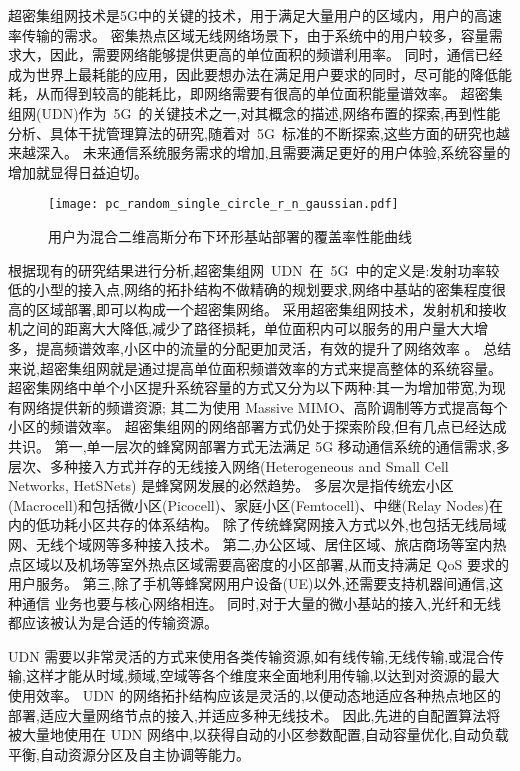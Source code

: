 超密集组网技术是5G中的关键的技术，用于满足大量用户的区域内，用户的高速率传输的需求。
密集热点区域无线网络场景下，由于系统中的用户较多，容量需求大，因此，需要网络能够提供更高的单位面积的频谱利用率。
同时，通信已经成为世界上最耗能的应用，因此要想办法在满足用户要求的同时，尽可能的降低能耗，从而得到较高的能耗比，即网络需要有很高的单位面积能量谱效率。
超密集组网(UDN)作为~5G~的关键技术之一,对其概念的描述,网络布置的探索,再到性能分析、具体干扰管理算法的研究,随着对~5G~标准的不断探索,这些方面的研究也越来越深入。
未来通信系统服务需求的增加,且需要满足更好的用户体验,系统容量的增加就显得日益迫切。
\begin{figure}[htbp]
\centering
\texttt{[image: pc\_random\_single\_circle\_r\_n\_gaussian.pdf]}
\caption{用户为混合二维高斯分布下环形基站部署的覆盖率性能曲线}\vspace{-0.5em}
\label{pc_random_single_circle_r_n_gaussian}
\end{figure}


根据现有的研究结果进行分析,超密集组网~UDN~在~5G~中的定义是:发射功率较低的小型的接入点,网络的拓扑结构不做精确的规划要求,网络中基站的密集程度很高的区域部署,即可以构成一个超密集网络。
采用超密集组网技术，发射机和接收机之间的距离大大降低,减少了路径损耗，单位面积内可以服务的用户量大大增多，提高频谱效率,小区中的流量的分配更加灵活，有效的提升了网络效率 。
总结来说,超密集组网就是通过提高单位面积频谱效率的方式来提高整体的系统容量。
超密集网络中单个小区提升系统容量的方式又分为以下两种:其一为增加带宽,为现有网络提供新的频谱资源;
其二为使用 Massive MIMO、高阶调制等方式提高每个小区的频谱效率。
超密集组网的网络部署方式仍处于探索阶段,但有几点已经达成共识。
第一,单一层次的蜂窝网部署方式无法满足 5G 移动通信系统的通信需求,多层次、多种接入方式并存的无线接入网络(Heterogeneous and Small Cell Networks, HetSNets)
是蜂窝网发展的必然趋势。
多层次是指传统宏小区(Macrocell)和包括微小区(Picocell)、家庭小区(Femtocell)、中继(Relay Nodes)在内的低功耗小区共存的体系结构。
除了传统蜂窝网接入方式以外,也包括无线局域网、无线个域网等多种接入技术。
第二,办公区域、居住区域、旅店商场等室内热点区域以及机场等室外热点区域需要高密度的小区部署,从而支持满足 QoS 要求的用户服务。
第三,除了手机等蜂窝网用户设备(UE)以外,还需要支持机器间通信,这种通信
业务也要与核心网络相连。
同时,对于大量的微小基站的接入,光纤和无线都应该被认为是合适的传输资源。

UDN 需要以非常灵活的方式来使用各类传输资源,如有线传输,无线传输,或混合传输,这样才能从时域,频域,空域等各个维度来全面地利用传输,以达到对资源的最大使用效率。
UDN 的网络拓扑结构应该是灵活的,以便动态地适应各种热点地区的部署,适应大量网络节点的接入,并适应多种无线技术。
因此,先进的自配置算法将被大量地使用在 UDN 网络中,以获得自动的小区参数配置,自动容量优化,自动负载平衡,自动资源分区及自主协调等能力。

